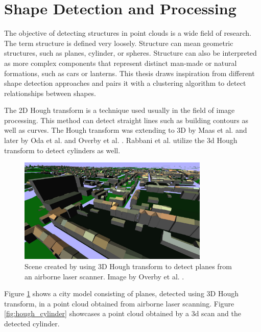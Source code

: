 \section {Shape Detection and Processing}
\label{sec:related_work_shape detection}

The objective of detecting structures in point clouds is a wide field of research. The term structure is defined very loosely. Structure can mean geometric structures, such as planes, cylinder, or spheres. Structure can also be interpreted as more complex components that represent distinct man-made or natural formations, such as cars or lanterns. This thesis draws inspiration from different shape detection approaches and pairs it with a clustering algorithm to detect relationships between shapes. 

\par


The 2D Hough transform \cite{hough1962method} is a technique used usually in the field of image processing. This method can detect straight lines such as building contours as well as curves. The Hough transform was extending to 3D by Maas et al. \cite{maas1999two} and later by Oda et al. \cite{oda2004automatic} and Overby et al. \cite{overby2004automatic}. Rabbani et al. \cite{rabbani2005efficient} utilize the 3d Hough transform to detect cylinders as well. 


\begin{figure}
    \centering
    \includegraphics[width=0.81\textwidth]{Related_Work/hough_planes.png}%
    \caption[Scene created by using 3d Hough transform to detect planes from an airborne laser scanner]
		{Scene created by using 3D Hough transform to detect planes from an airborne laser scanner. Image by Overby et al. \cite{overby2004automatic}.}
    \label{fig:hough_planes}
\end{figure}

Figure \ref{fig:hough_planes} shows a city model consisting of planes, detected using 3D Hough transform, in a point cloud obtained from airborne laser scanning. Figure \ref{fig:hough_cylinder} showcases a point cloud obtained by a 3d scan and the detected cylinder. 


